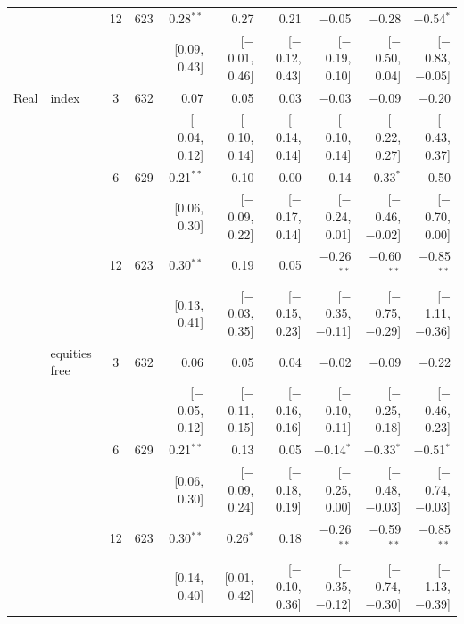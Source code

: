 \begin{longtable}{llcrrrrrrr}
 &  & 12 & 623 & 0.28$^{**}$ & 0.27 & 0.21 & $-$0.05 & $-$0.28 & $-$0.54$^{*}$\\
 & & & & {\scriptsize [0.09, 0.43]} & {\scriptsize [$-$0.01, 0.46]} & {\scriptsize [$-$0.12, 0.43]} & {\scriptsize [$-$0.19, 0.10]} & {\scriptsize [$-$0.50, 0.04]} & {\scriptsize [$-$0.83, $-$0.05]}\\
\addlinespace
Real & index & 3 & 632 & 0.07 & 0.05 & 0.03 & $-$0.03 & $-$0.09 & $-$0.20\\
 & & & & {\scriptsize [$-$0.04, 0.12]} & {\scriptsize [$-$0.10, 0.14]} & {\scriptsize [$-$0.14, 0.14]} & {\scriptsize [$-$0.10, 0.14]} & {\scriptsize [$-$0.22, 0.27]} & {\scriptsize [$-$0.43, 0.37]}\\
 &  & 6 & 629 & 0.21$^{**}$ & 0.10 & 0.00 & $-$0.14 & $-$0.33$^{*}$ & $-$0.50\\
 & & & & {\scriptsize [0.06, 0.30]} & {\scriptsize [$-$0.09, 0.22]} & {\scriptsize [$-$0.17, 0.14]} & {\scriptsize [$-$0.24, 0.01]} & {\scriptsize [$-$0.46, $-$0.02]} & {\scriptsize [$-$0.70, 0.00]}\\
 &  & 12 & 623 & 0.30$^{**}$ & 0.19 & 0.05 & $-$0.26$^{**}$ & $-$0.60$^{**}$ & $-$0.85$^{**}$\\
 & & & & {\scriptsize [0.13, 0.41]} & {\scriptsize [$-$0.03, 0.35]} & {\scriptsize [$-$0.15, 0.23]} & {\scriptsize [$-$0.35, $-$0.11]} & {\scriptsize [$-$0.75, $-$0.29]} & {\scriptsize [$-$1.11, $-$0.36]}\\
 & equities free & 3 & 632 & 0.06 & 0.05 & 0.04 & $-$0.02 & $-$0.09 & $-$0.22\\
 & & & & {\scriptsize [$-$0.05, 0.12]} & {\scriptsize [$-$0.11, 0.15]} & {\scriptsize [$-$0.16, 0.16]} & {\scriptsize [$-$0.10, 0.11]} & {\scriptsize [$-$0.25, 0.18]} & {\scriptsize [$-$0.46, 0.23]}\\
 &  & 6 & 629 & 0.21$^{**}$ & 0.13 & 0.05 & $-$0.14$^{*}$ & $-$0.33$^{*}$ & $-$0.51$^{*}$\\
 & & & & {\scriptsize [0.06, 0.30]} & {\scriptsize [$-$0.09, 0.24]} & {\scriptsize [$-$0.18, 0.19]} & {\scriptsize [$-$0.25, 0.00]} & {\scriptsize [$-$0.48, $-$0.03]} & {\scriptsize [$-$0.74, $-$0.03]}\\
 &  & 12 & 623 & 0.30$^{**}$ & 0.26$^{*}$ & 0.18 & $-$0.26$^{**}$ & $-$0.59$^{**}$ & $-$0.85$^{**}$\\
 & & & & {\scriptsize [0.14, 0.40]} & {\scriptsize [0.01, 0.42]} & {\scriptsize [$-$0.10, 0.36]} & {\scriptsize [$-$0.35, $-$0.12]} & {\scriptsize [$-$0.74, $-$0.30]} & {\scriptsize [$-$1.13, $-$0.39]}\\

\end{longtable}
